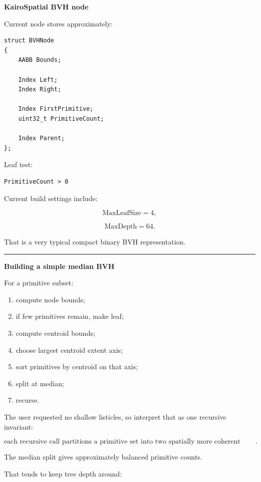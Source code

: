\textbf{KairoSpatial BVH node}

Current node stores approximately:

\begin{verbatim}
struct BVHNode
{
    AABB Bounds;

    Index Left;
    Index Right;

    Index FirstPrimitive;
    uint32_t PrimitiveCount;

    Index Parent;
};
\end{verbatim}

Leaf test:

\begin{verbatim}
PrimitiveCount > 0
\end{verbatim}

Current build settings include:

\[
\text{MaxLeafSize}=4,
\]

\[
\text{MaxDepth}=64.
\]

That is a very typical compact binary BVH representation.

\begin{center}\rule{0.5\linewidth}{0.5pt}\end{center}

\textbf{Building a simple median BVH}

For a primitive subset:

\begin{enumerate}
\def\labelenumi{\arabic{enumi}.}
\tightlist
\item
  compute node bounds;
\item
  if few primitives remain, make leaf;
\item
  compute centroid bounds;
\item
  choose largest centroid extent axis;
\item
  sort primitives by centroid on that axis;
\item
  split at median;
\item
  recurse.
\end{enumerate}

The user requested no shallow listicles, so interpret that as one recursive invariant:

\[
\boxed{
\text{each recursive call partitions a primitive set into two spatially more coherent subsets until leaf criteria are reached}.
}
\]

The median split gives approximately balanced primitive counts.

That tends to keep tree depth around:

